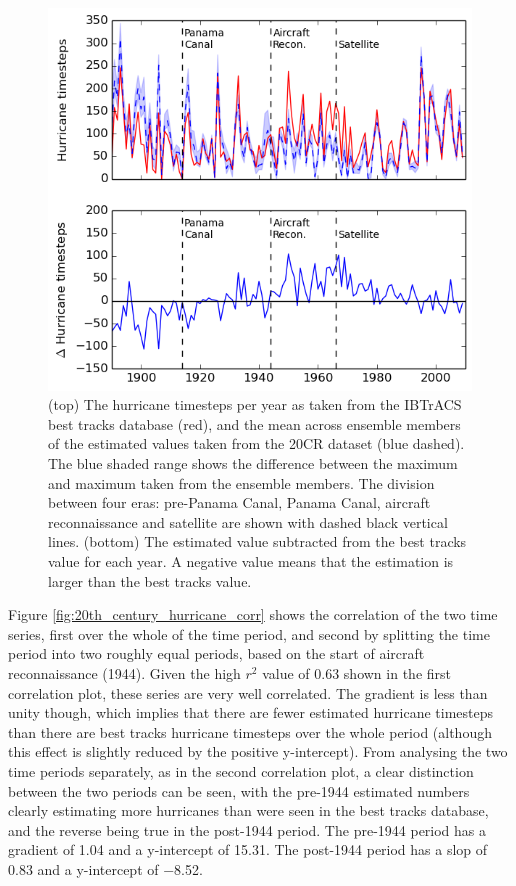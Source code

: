 \documentclass[pdftex,12pt,a4paper]{report}
\begin{document}
\begin{figure}[ht!]
    \centering
    \includegraphics[width=\textwidth]{figures/20th_century_hurricane_timesteps}
    \caption{(top) The hurricane timesteps per year as taken from the IBTrACS best tracks database
        (red), and the mean across ensemble members of the estimated values taken from the 20CR
        dataset (blue dashed). The blue shaded range shows the difference between the maximum and maximum
        taken from the ensemble members. The division between four eras: pre-Panama Canal, Panama
        Canal, aircraft reconnaissance and satellite are shown with dashed black vertical lines.
        (bottom) The estimated value subtracted from the best tracks value for each year. A negative
        value means that the estimation is larger than the best tracks value.}
    \label{fig:20th_century_hurricane_timesteps}
\end{figure}

\newpage
Figure \ref{fig:20th_century_hurricane_corr} shows the correlation of the two time series, first
over the whole of the time period, and second by splitting the time period into two roughly equal
periods, based on the start of aircraft reconnaissance (1944). Given the high $r^2$ value of
\SI{0.63}{} shown in the first correlation plot, these series are very well correlated. The gradient
is less than unity though, which implies that there are fewer estimated hurricane timesteps than
there are best tracks hurricane timesteps over the whole period (although this effect is slightly
reduced by the positive y-intercept). From analysing the two time periods separately, as in the
second correlation plot, a clear distinction between the two periods can be seen, with the pre-1944
estimated numbers clearly estimating more hurricanes than were seen in the best tracks database, and
the reverse being true in the post-1944 period. The pre-1944 period has a gradient of \SI{1.04}{}
and a y-intercept of \SI{15.31}{}. The post-1944 period has a slop of \SI{0.83}{} and a y-intercept
of \SI{-8.52}{}.
\end{document}
